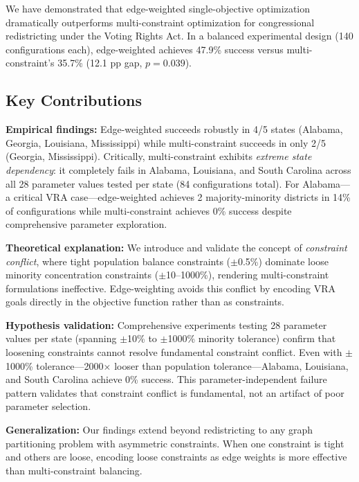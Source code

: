 \label{sec:conclusion}

We have demonstrated that edge-weighted single-objective optimization dramatically outperforms multi-constraint optimization for congressional redistricting under the Voting Rights Act. In a balanced experimental design (140 configurations each), edge-weighted achieves 47.9\% success versus multi-constraint's 35.7\% (12.1 pp gap, $p=0.039$).

\subsection{Key Contributions}

\textbf{Empirical findings:} Edge-weighted succeeds robustly in 4/5 states (Alabama, Georgia, Louisiana, Mississippi) while multi-constraint succeeds in only 2/5 (Georgia, Mississippi). Critically, multi-constraint exhibits \textit{extreme state dependency}: it completely fails in Alabama, Louisiana, and South Carolina across all 28 parameter values tested per state (84 configurations total). For Alabama---a critical VRA case---edge-weighted achieves 2 majority-minority districts in 14\% of configurations while multi-constraint achieves 0\% success despite comprehensive parameter exploration.

\textbf{Theoretical explanation:} We introduce and validate the concept of \textit{constraint conflict}, where tight population balance constraints ($\pm$0.5\%) dominate loose minority concentration constraints ($\pm$10--1000\%), rendering multi-constraint formulations ineffective. Edge-weighting avoids this conflict by encoding VRA goals directly in the objective function rather than as constraints.

\textbf{Hypothesis validation:} Comprehensive experiments testing 28 parameter values per state (spanning $\pm$10\% to $\pm$1000\% minority tolerance) confirm that loosening constraints cannot resolve fundamental constraint conflict. Even with $\pm$1000\% tolerance---2000× looser than population tolerance---Alabama, Louisiana, and South Carolina achieve 0\% success. This parameter-independent failure pattern validates that constraint conflict is fundamental, not an artifact of poor parameter selection.

\textbf{Generalization:} Our findings extend beyond redistricting to any graph partitioning problem with asymmetric constraints. When one constraint is tight and others are loose, encoding loose constraints as edge weights is more effective than multi-constraint balancing.

